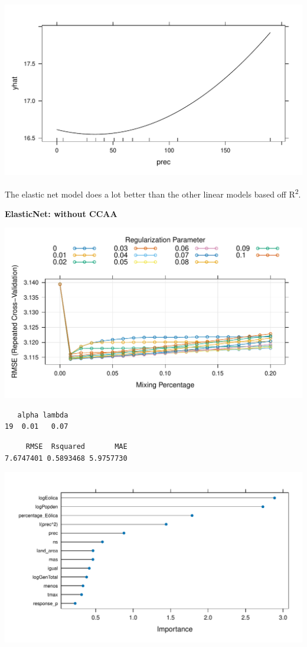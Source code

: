 \documentclass[
]{report}
\begin{document}
\includegraphics{Modelling_Energy_Intensity-V3_files/figure-pdf/unnamed-chunk-11-4.pdf}

The elastic net model does a lot better than the other linear models
based off R\textsuperscript{2}.

\textbf{ElasticNet: without CCAA}

\includegraphics{Modelling_Energy_Intensity-V3_files/figure-pdf/unnamed-chunk-12-1.pdf}

\begin{verbatim}
   alpha lambda
19  0.01   0.07
\end{verbatim}

\begin{verbatim}
     RMSE  Rsquared       MAE 
7.6747401 0.5893468 5.9757730 
\end{verbatim}

\includegraphics{Modelling_Energy_Intensity-V3_files/figure-pdf/unnamed-chunk-13-1.pdf}
\end{document}

